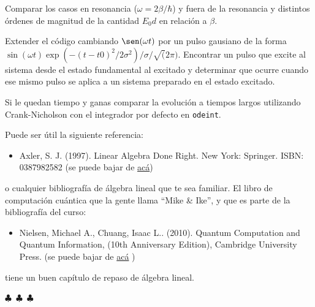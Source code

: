 \documentclass[a4paper,12pt]{article}
\begin{document}
\begin{enumerate}
    Comparar los casos en resonancia ($\omega = 2\beta/\hbar$) y fuera de la resonancia y distintos órdenes de magnitud de la cantidad $E_0 d$ en relación a $\beta$.

    Extender el código cambiando $\sen(\omega t)$ por un pulso gausiano de la forma $\sin(\omega t)\exp(-(t-t0)^2/2\sigma^2)/\sigma/\sqrt(2\pi)$. Encontrar un pulso que excite al sistema desde el estado fundamental al excitado y determinar que ocurre cuando ese mismo pulso se aplica a un sistema preparado en el estado excitado.

    Si le quedan tiempo y ganas comparar la evolución a tiempos largos utilizando Crank-Nicholson con el integrador por defecto en {\tt odeint}.


\end{enumerate}

\noindent Puede ser útil la siguiente referencia:
 \begin{itemize}
     \item Axler, S. J. (1997). Linear Algebra Done Right. New York: Springer. ISBN: 0387982582 (se puede bajar de \href{https://drive.google.com/file/d/1_qZOW2kRbgqRhuUlvlGcM7RA3KjVcvuB/view?usp=sharing}{acá})
 \end{itemize}
o cualquier bibliografía de álgebra lineal que te sea familiar. El libro de computación cuántica que la gente llama ``Mike \& Ike'', y que es parte de la bibliografía del curso:
\begin{itemize}
    \item Nielsen, Michael A., Chuang, Isaac L.. (2010). Quantum Computation and Quantum Information, (10th Anniversary Edition), Cambridge University Press. (se puede bajar de \href{https://drive.google.com/file/d/1qk7L6Roq1WlGWSahW66ZX-rwl_wjTxcL/view?usp=sharing}{acá} )
\end{itemize}
tiene un buen capítulo de repaso de álgebra lineal.

\begin{center}
    $\clubsuit$~$\clubsuit$~$\clubsuit$
  \end{center}
\end{document}
